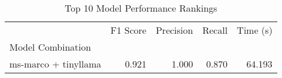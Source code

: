 \begin{table}
\caption{Top 10 Model Performance Rankings}
\label{tab:model_rankings}
\begin{tabular}{lrrrr}
\toprule
 & F1 Score & Precision & Recall & Time (s) \\
Model Combination &  &  &  &  \\
\midrule
ms-marco + tinyllama & 0.921 & 1.000 & 0.870 & 64.193 \\
\bottomrule
\end{tabular}
\end{table}
